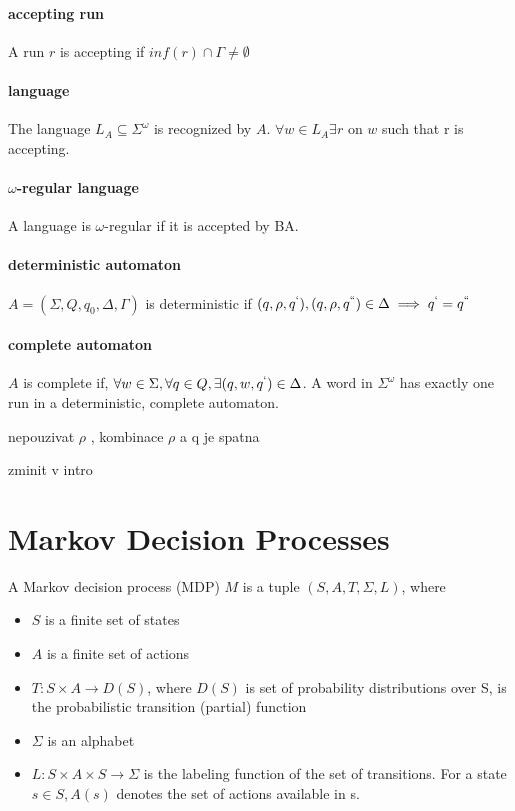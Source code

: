 \documentclass[
	digital
nolof, nolot
]{fithesis3}
\begin{document}
		\paragraph{accepting run} A run $r$ is accepting if $inf(r) \cap \Gamma \neq \emptyset$
		\paragraph{language}
		The language $L_A\subseteq\Sigma^\omega$ is recognized by $A$.\newline
		$\forall w \in L_A \exists r$ on $w$ such that r is accepting.
		\paragraph{$\omega$-regular language}
		A language is $\omega$-regular if it is accepted by BA.
		\paragraph{deterministic automaton}
		$A=(\Sigma, Q, q_0, \Delta, \Gamma)$ is deterministic if \newline$(q, \rho, q^`), (q, \rho, q^{``})\in\Delta\implies q^`=q^{``}$
		\paragraph{complete automaton}
		$A$ is complete if, $\forall w \in \Sigma, \forall q \in Q, \exists (q, w, q^`)\in\Delta$. A word in $\Sigma^\omega$ has exactly one run in a deterministic, complete automaton. 
		
		nepouzivat $\rho$ , kombinace $\rho$ a q je spatna
		
		zminit v intro
		\section{Markov Decision Processes}
		A Markov decision process (MDP) $M$
		is a tuple $(S, A, T, \Sigma, L)$, where
		\begin{itemize}
			\item $S$ is a finite set of states
			\item $A$ is a finite set of actions
			\item $T:S\times A \rightarrow D(S)$, where $D(S)$ is set of probability distributions over S, is  the probabilistic transition (partial) function
			\item $\Sigma$ is an alphabet
			\item $L:S\times A \times S \rightarrow \Sigma$ is the labeling function of the set of transitions.
			For a state $s \in S, A(s)$ denotes the set of actions available in s.
		\end{itemize}
\end{document}

